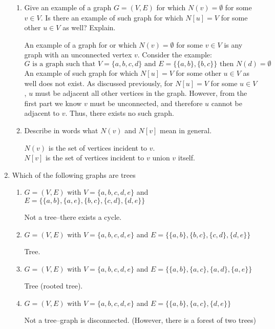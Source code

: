 \documentclass[11pt, letterpaper, includehead]{article}
\theoremstyle{plain}
\theoremstyle{mydefinition}
\theoremstyle{myproperty}
\begin{document}
\begin{enumerate}[label=\textbf{\arabic*}., leftmargin=*]
\begin{enumerate}[label=(\alph*)]
        
        \item Give an example of a graph $G = (V, E)$ for which $N(v) = \emptyset$  for some $v \in V$. Is there an example of such graph for which $N[u] = V$ for some other $u \in V$ as well? Explain.
        
        An example of a graph for or which $N(v) = \emptyset$ for some $v \in V$ is any graph with an unconnected vertex $v$. Consider the example:
        \[G \text{ is a graph such that } V = \{a, b, c, d\} \text{ and } E = \{ \{a, b \}, \{b, c \}\} \text{ then } N(d) = \emptyset\]
        An example of such graph for which $N[u] = V$ for some other $u \in V$ as well does not exist. As discussed previously, for $N[u] = V$ for some $u \in V$, $u$ must be adjacent all other vertices in the graph. However, from the first part we know $v$ must be unconnected, and therefore $u$ cannot be adjacent to $v$. Thus, there exists no such graph.
        
        \item Describe in words what $N(v)$ and $N[v]$ mean in general.

        $N(v)$ is the set of vertices incident to $v$.\\
        $N[v]$ is the set of vertices incident to $v$ union $v$ itself.

    \end{enumerate}

    \item Which of the following graphs are trees
    \begin{enumerate}[label=(\alph*)]
        \item $G = (V, E)$ with $V = \{a, b, c, d, e\}$ and $E = \{ \{a, b \}, \{a, e \}, \{b, c \}, \{c, d \}, \{d, e\}\}$ 
        
        Not a tree--there exists a cycle.
        \item $G = (V, E)$ with $V = \{a, b, c, d, e\}$ and $E = \{ \{a, b \}, \{b, c \}, \{c, d \}, \{d, e \}\}$
        
        Tree.
        \item $G = (V, E)$ with $V = \{a, b, c, d, e\}$ and $E = \{ \{a, b \}, \{a, c \}, \{a, d \}, \{a, e \}\}$
        
        Tree (rooted tree).
        \item $G = (V, E)$ with $V = \{a, b, c, d, e\}$ and $E = \{ \{a, b \}, \{a, c \}, \{d, e \}\}$
        
        Not a tree--graph is disconnected. (However, there is a forest of two trees)
    \end{enumerate}


\end{enumerate}
\end{document}
